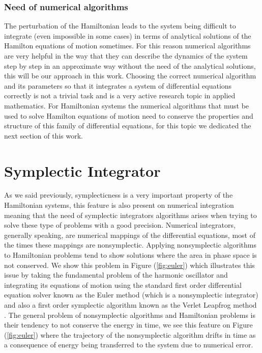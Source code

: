 \subsubsection{Need of numerical algorithms}

The perturbation of the Hamiltonian leads to the system being difficult to integrate (even impossible in some cases) in terms of analytical solutions of the Hamilton equations of motion sometimes. For this reason numerical algorithms are very helpful in the way that they can describe the dynamics of the system step by step in an approximate way without the need of the analytical solutions, this will be our approach in this work. Choosing the correct numerical algorithm and its parameters so that it integrates a system of differential equations correctly is not a trivial task and is a very active research topic in applied mathematics. For Hamiltonian systems the numerical algorithms that must be used to solve Hamilton equations of motion need to conserve the properties and structure of this family of differential equations, for this topic we dedicated the next section of this work.



\section{Symplectic Integrator}
As we said previously, symplecticness is a very important property of the Hamiltonian systems, this feature is also present on numerical integration meaning that the need of symplectic integrators algorithms arises when trying to solve these type of problems with a good precision. Numerical integrators, generally speaking, are  numerical mappings of the differential equations, most of the times these mappings are nonsymplectic. Applying nonsymplectic algorithms to Hamiltonian problems tend to show solutions where the area in phase space is not conserved. We show this problem in Figure (\ref{fig:euler}) which illustrates this issue by taking the fundamental problem of the harmonic oscillator and integrating its equations of motion using the standard first order differential equation solver known as the Euler method (which is a nonsymplectic integrator) and also a first order symplectic algorithm known as the Verlet Leapfrog method\cite{verlet1967computer}  \cite{forest1990fourth}. The general problem of nonsymplectic algorithms and Hamiltonian problems is their tendency to not conserve the energy in time, we see this feature on Figure (\ref{fig:euler}) where the trajectory of the nonsymplectic algorithm drifts in time as a consequence of energy being transferred to the system due to numerical error.



